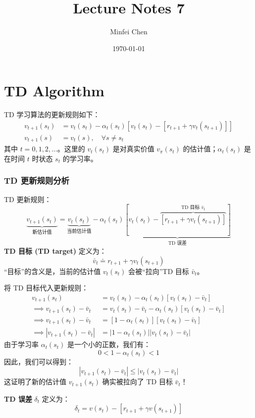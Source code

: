\documentclass{article}
\begin{document}
\title{Lecture Notes 7}
\author{Minfei Chen}
\date{\today}
\maketitle
\section{TD Algorithm}
TD 学习算法的更新规则如下：
\begin{align*}
    v_{t+1}(s_t) &= v_t(s_t) - \alpha_t(s_t) \left[ v_t(s_t) - [r_{t+1} + \gamma v_t(s_{t+1})] \right] \\
    v_{t+1}(s) &= v_t(s), \quad \forall s \neq s_t
\end{align*}
其中 $t = 0, 1, 2, \dots$。这里的 $v_t(s_t)$ 是对真实价值 $v_{\pi}(s_t)$ 的估计值；$\alpha_t(s_t)$ 是在时间 $t$ 时状态 $s_t$ 的学习率。

\subsubsection*{TD 更新规则分析}

TD 更新规则：
\[
\underbrace{v_{t+1}(s_t)}_{\text{新估计值}} = \underbrace{v_t(s_t)}_{\text{当前估计值}} - \alpha_t(s_t) \underbrace{\left[ v_t(s_t) - \overbrace{[r_{t+1} + \gamma v_t(s_{t+1})]}^{\text{TD 目标 } \bar{v}_t} \right]}_{\text{TD 误差}}
\]
 \textbf{TD 目标 (TD target)} 定义为：
\[
\bar{v}_t \doteq r_{t+1} + \gamma v_t(s_{t+1})
\]
“目标”的含义是，当前的估计值 $v_t(s_t)$ 会被“拉向”TD 目标 $\bar{v}_t$。

将 TD 目标代入更新规则：
\begin{align*}
    v_{t+1}(s_t) &= v_t(s_t) - \alpha_t(s_t) [v_t(s_t) - \bar{v}_t] \\
    \implies v_{t+1}(s_t) - \bar{v}_t &= v_t(s_t) - \bar{v}_t - \alpha_t(s_t) [v_t(s_t) - \bar{v}_t] \\
    \implies v_{t+1}(s_t) - \bar{v}_t &= [1 - \alpha_t(s_t)][v_t(s_t) - \bar{v}_t] \\
    \implies |v_{t+1}(s_t) - \bar{v}_t| &= |1 - \alpha_t(s_t)| |v_t(s_t) - \bar{v}_t|
\end{align*}
由于学习率 $\alpha_t(s_t)$ 是一个小的正数，我们有：
\[
0 < 1 - \alpha_t(s_t) < 1
\]
因此，我们可以得到：
\[
|v_{t+1}(s_t) - \bar{v}_t| \le |v_t(s_t) - \bar{v}_t|
\]
这证明了新的估计值 $v_{t+1}(s_t)$ 确实被拉向了 TD 目标 $\bar{v}_t$！

\textbf{TD 误差} $\delta_t$ 定义为：
\[
\delta_t = v(s_t) - [r_{t+1} + \gamma v(s_{t+1})]
\]
\end{document}
